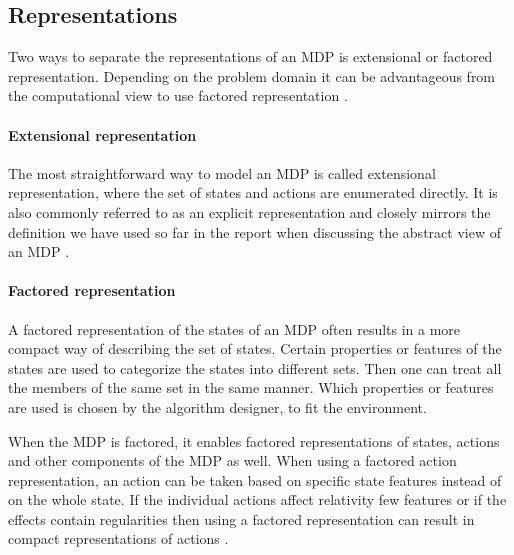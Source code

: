 \subsection{Representations}
Two ways to separate the representations of an MDP is extensional or factored representation. Depending on the problem domain it can be advantageous from the computational view to use factored representation \parencite{dean1999descision}.

\paragraph{Extensional representation}
The most straightforward way to model an MDP is called extensional representation, where the set of states and actions are enumerated directly. It is also commonly referred to as an explicit representation and closely mirrors the definition we have used so far in the report when discussing the abstract view of an MDP \parencite{dean1999descision}.

\paragraph{Factored representation} 

A factored representation of the states of an MDP often results in a more
compact way of describing the set of states. Certain properties or features of
the states are used to categorize the states into different sets. Then one can
treat all the members of the same set in the same manner. Which properties or
features are used is chosen by the algorithm designer, to fit the environment.

When the MDP is factored, it enables factored representations of states,
actions and other components of the MDP as well. When using a factored action
representation, an action can be taken based on specific state features instead
of on the whole state. If the individual actions affect relativity few features
or if the effects contain regularities then using a factored representation can
result in compact representations of actions \parencite{dean1999descision}. 
